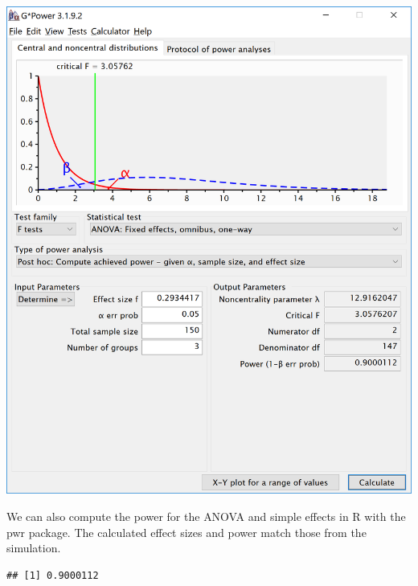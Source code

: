 \documentclass[]{book}
\newenvironment{Shaded}{\begin{snugshade}}{\end{snugshade}}
\newcommand{\DataTypeTok}[1]{\textcolor[rgb]{0.13,0.29,0.53}{#1}}
\newcommand{\DecValTok}[1]{\textcolor[rgb]{0.00,0.00,0.81}{#1}}
\newcommand{\FloatTok}[1]{\textcolor[rgb]{0.00,0.00,0.81}{#1}}
\newcommand{\KeywordTok}[1]{\textcolor[rgb]{0.13,0.29,0.53}{\textbf{#1}}}
\newcommand{\NormalTok}[1]{#1}
\newcommand{\OperatorTok}[1]{\textcolor[rgb]{0.81,0.36,0.00}{\textbf{#1}}}
\newcommand{\StringTok}[1]{\textcolor[rgb]{0.31,0.60,0.02}{#1}}
\begin{document}
\includegraphics{screenshots/gpower_7.png}

We can also compute the power for the ANOVA and simple effects in R with the pwr package. The calculated effect sizes and power match those from the simulation.

\begin{Shaded}
\end{Shaded}

\begin{verbatim}
## [1] 0.9000112
\end{verbatim}
\end{document}
